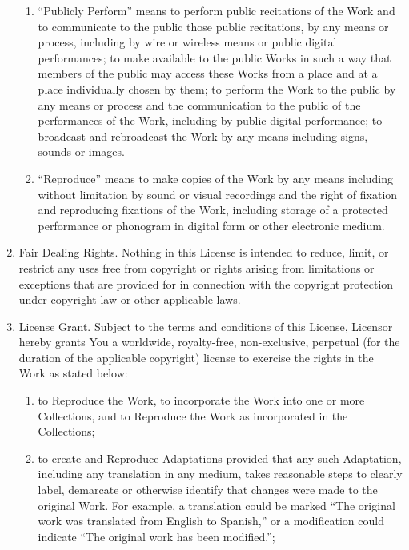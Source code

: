 \documentclass[letterpaper,10pt,english]{manual}
\begin{document}
\begin{enumerate}
\begin{enumerate}
\item {} 
``Publicly Perform'' means to perform public recitations of the Work and to communicate to the public those public recitations, by any means or process, including by wire or wireless means or public digital performances; to make available to the public Works in such a way that members of the public may access these Works from a place and at a place individually chosen by them; to perform the Work to the public by any means or process and the communication to the public of the performances of the Work, including by public digital performance; to broadcast and rebroadcast the Work by any means including signs, sounds or images.

\item {} 
``Reproduce'' means to make copies of the Work by any means including without limitation by sound or visual recordings and the right of fixation and reproducing fixations of the Work, including storage of a protected performance or phonogram in digital form or other electronic medium.

\end{enumerate}

\item {} 
Fair Dealing Rights. Nothing in this License is intended to reduce, limit, or restrict any uses free from copyright or rights arising from limitations or exceptions that are provided for in connection with the copyright protection under copyright law or other applicable laws.

\item {} 
License Grant. Subject to the terms and conditions of this License, Licensor hereby grants You a worldwide, royalty-free, non-exclusive, perpetual (for the duration of the applicable copyright) license to exercise the rights in the Work as stated below:
\begin{enumerate}
\item {} 
to Reproduce the Work, to incorporate the Work into one or more Collections, and to Reproduce the Work as incorporated in the Collections;

\item {} 
to create and Reproduce Adaptations provided that any such Adaptation, including any translation in any medium, takes reasonable steps to clearly label, demarcate or otherwise identify that changes were made to the original Work. For example, a translation could be marked ``The original work was translated from English to Spanish,'' or a modification could indicate ``The original work has been modified.'';


\end{enumerate}
\end{enumerate}
\end{document}

